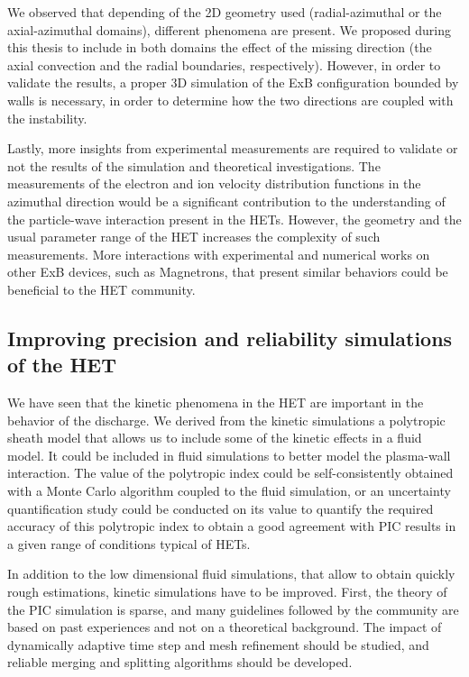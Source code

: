     We observed that depending of the 2D geometry used (radial-azimuthal or the axial-azimuthal domains), different phenomena are present.
    We proposed during this thesis to include in both domains the effect of the missing direction (the axial convection and the radial boundaries, respectively).
    However, in order to validate the results, a proper 3D simulation of the ExB configuration bounded by walls is necessary, in order to determine how the two directions are coupled with the instability.

    Lastly, more insights from experimental measurements are required to validate or not the results of the simulation and theoretical investigations.
    The measurements of the electron and ion velocity distribution functions in the azimuthal direction would be a significant contribution to the understanding of the particle-wave interaction present in the HETs.
    However, the geometry and the usual parameter range of the HET increases the complexity of such measurements.
    More interactions with experimental and numerical works on other ExB devices, such as Magnetrons, that present similar behaviors could be beneficial to the HET community.

  \subsection{Improving precision and reliability simulations of the HET}

    We have seen that the kinetic phenomena in the HET are important in the behavior of the discharge.
    We derived from the kinetic simulations a polytropic sheath model that allows us to include some of the kinetic effects in a fluid model.
    It could be included in fluid simulations to better model the plasma-wall interaction.
    The value of the polytropic index could be self-consistently obtained with a Monte Carlo algorithm coupled to the fluid simulation, or an uncertainty quantification study could be conducted on its value  to quantify the required accuracy of this polytropic index to obtain a good agreement with PIC results in a given range of conditions typical of HETs.

    In addition to the low dimensional fluid simulations, that allow to obtain quickly rough estimations, kinetic simulations have to be improved.
    First, the theory of the PIC simulation is sparse, and many guidelines followed by the community are based on past experiences and not on a theoretical background.
    The impact of dynamically adaptive time step and mesh refinement should be studied, and reliable merging and splitting algorithms should be developed.

